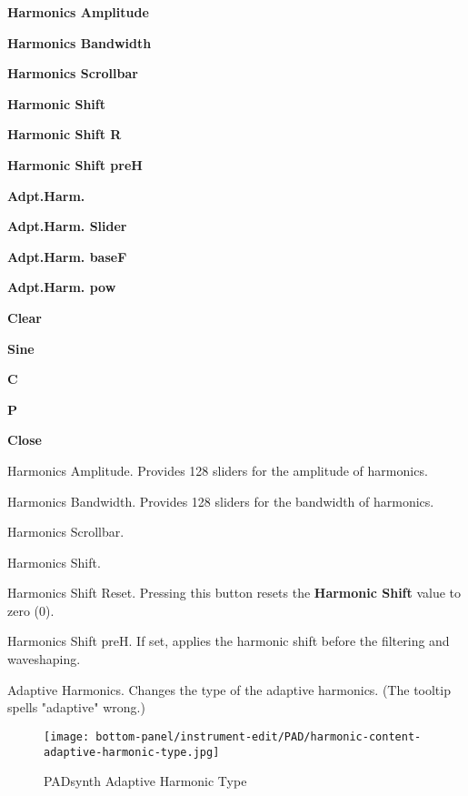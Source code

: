    \begin{enumber}
      \item \textbf{Harmonics Amplitude}
      \item \textbf{Harmonics Bandwidth}
      \item \textbf{Harmonics Scrollbar}
      \item \textbf{Harmonic Shift}
      \item \textbf{Harmonic Shift R}
      \item \textbf{Harmonic Shift preH}
      \item \textbf{Adpt.Harm.}
      \item \textbf{Adpt.Harm. Slider}
      \item \textbf{Adpt.Harm. baseF}
      \item \textbf{Adpt.Harm. pow}
      \item \textbf{Clear}
      \item \textbf{Sine}
      \item \textbf{C}
      \item \textbf{P}
      \item \textbf{Close}
   \end{enumber}

   Harmonics Amplitude.
   Provides 128 sliders for the amplitude of harmonics.

   Harmonics Bandwidth.
   Provides 128 sliders for the bandwidth of harmonics.

   Harmonics Scrollbar.

   Harmonics Shift.

   Harmonics Shift Reset.
   Pressing this button resets the \textbf{Harmonic Shift} value to zero
   (0).

   Harmonics Shift preH.
   If set, applies the harmonic shift before the filtering and waveshaping.

   Adaptive Harmonics.
   Changes the type of the adaptive harmonics.  
   (The tooltip spells "adaptive" wrong.)

\begin{figure}[H]
   \centering 
   \texttt{[image: bottom-panel/instrument-edit/PAD/harmonic-content-adaptive-harmonic-type.jpg]}
   \caption{PADsynth Adaptive Harmonic Type}
   \label{fig:padsynth_adaptive_harmonic_type}
\end{figure}

